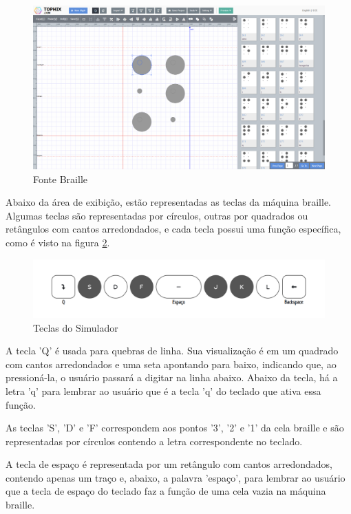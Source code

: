 \begin{figure}[h]
    \centering
    \includegraphics[scale=0.3]{ch06/assets/font-braille.png}
    \decoRule
    \caption[Fonte Braille]{Fonte Braille}
    \label{fig:ch06-fonte-braille}
\end{figure}

Abaixo da área de exibição, estão representadas as teclas da máquina braille. Algumas teclas são representadas por círculos, outras por quadrados ou retângulos com cantos arredondados, e cada tecla possui uma função específica, como é visto na figura \ref{fig:ch06-Teclas do Simulador}. 

\begin{figure}[h]
    \centering
    \includegraphics[scale=0.5]{ch06/assets/teclas-do-simulador.png}
    \decoRule
    \caption[Teclas do Simulador]{Teclas do Simulador}
    \label{fig:ch06-Teclas do Simulador}
\end{figure}

A tecla 'Q' é usada para quebras de linha. Sua visualização é em um quadrado com cantos arredondados e uma seta apontando para baixo, indicando que, ao pressioná-la, o usuário passará a digitar na linha abaixo. Abaixo da tecla, há a letra 'q' para lembrar ao usuário que é a tecla 'q' do teclado que ativa essa função. 

As teclas 'S', 'D' e 'F' correspondem aos pontos '3', '2' e '1' da cela braille e são representadas por círculos contendo a letra correspondente no teclado. 

A tecla de espaço é representada por um retângulo com cantos arredondados, contendo apenas um traço e, abaixo, a palavra 'espaço', para lembrar ao usuário que a tecla de espaço do teclado faz a função de uma cela vazia na máquina braille. 

